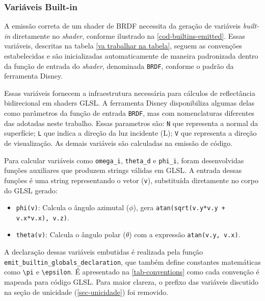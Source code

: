\subsubsection{Variáveis Built-in}
A emissão correta de um shader de BRDF necessita da geração de variáveis \textit{built-in} diretamente no \textit{shader}, conforme ilustrado na \autoref{cod-builtins-emitted}. Essas variáveis, descritas na tabela \autoref{va trabalhar na tabela}, seguem as convenções estabelecidas e são inicializadas automaticamente de maneira padronizada dentro da função de entrada do \textit{shader}, denominada \verb|BRDF|, conforme o padrão da ferramenta Disney.

Essas variáveis fornecem a infraestrutura necessária para cálculos de reflectância bidirecional em shaders GLSL. A ferramenta Disney disponibiliza algumas delas como parâmetros da função de entrada \verb`BRDF`, mas com nomenclaturas diferentes das adotadas neste trabalho. Essas parametros são: \verb"N" que representa a normal da superfície; \verb"L" que indica a direção da luz incidente (L); \verb"V" que representa a direção de visualização. As demais variáveis são calculadas na emissão de código.

Para calcular variáveis como \verb`omega_i`, \verb`theta_d` e \verb`phi_i`, foram desenvolvidas funções auxiliares que produzem strings válidas em GLSL. A entrada dessas funções é uma string representando o vetor (\verb`v`), substituída diretamente no corpo do GLSL gerado:  
\begin{itemize}
    \item \verb`phi(v)`: Calcula o ângulo azimutal ($\phi$), gera \verb`atan(sqrt(v.y*v.y + v.x*v.x), v.z)`.
    \item \verb`theta(v)`: Calcula o ângulo polar ($\theta$) com a expressão \verb`atan(v.y, v.x)`.
\end{itemize}

A declaração dessas variáveis embutidas é realizada pela função \\ \verb`emit_builtin_globals_declaration`, que também define constantes matemáticas como \verb`\pi`  e \verb`\epsilon`. É apresentado na \autoref{tab-conventions} como cada convenção é mapeada para código GLSL. Para maior clareza, o prefixo das variáveis discutido na seção de unicidade (\autoref{sec-unicidade}) foi removido.

